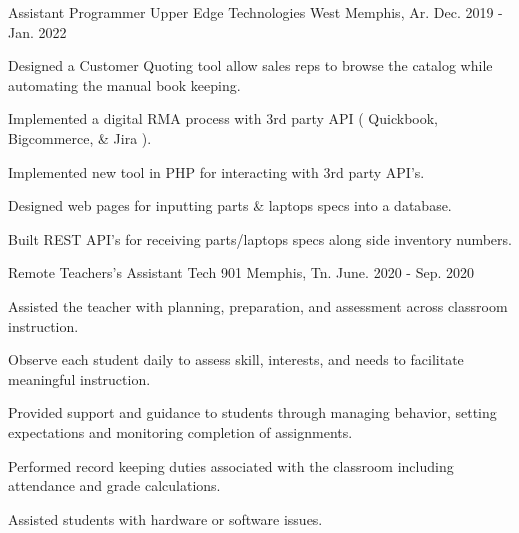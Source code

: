 

\begin{cventries}

  \cventry
    {Assistant Programmer} %
    {Upper Edge Technologies } %
    {West Memphis, Ar.} %
    {Dec. 2019 - Jan. 2022} %
    {
      \begin{cvitems} %
        \item {Designed a Customer Quoting tool allow sales reps to browse the catalog while automating the manual book keeping.}
        \item {Implemented a digital RMA process with 3rd party API ( Quickbook, Bigcommerce, \& Jira ).}
        \item {Implemented new tool in PHP for interacting with 3rd party API's.}
        \item {Designed web pages for inputting parts \& laptops specs into a database.}
        \item {Built REST API's for receiving parts/laptops specs along side inventory numbers.}
      \end{cvitems}
    }

  \cventry
    { Remote Teachers's Assistant } %
    {Tech 901} %
    {Memphis, Tn.} %
    {June. 2020 - Sep. 2020} %
    {
      \begin{cvitems} %
        \item {Assisted the teacher with planning, preparation, and assessment across classroom instruction.}
        \item {Observe each student daily to assess skill, interests, and needs to facilitate meaningful instruction.}
        \item {Provided support and guidance to students through managing behavior, setting expectations and monitoring completion of assignments.}
        \item {Performed record keeping duties associated with the classroom including attendance and grade calculations.}
        \item {Assisted students with hardware or software issues.}
      \end{cvitems}
    }

\end{cventries}
